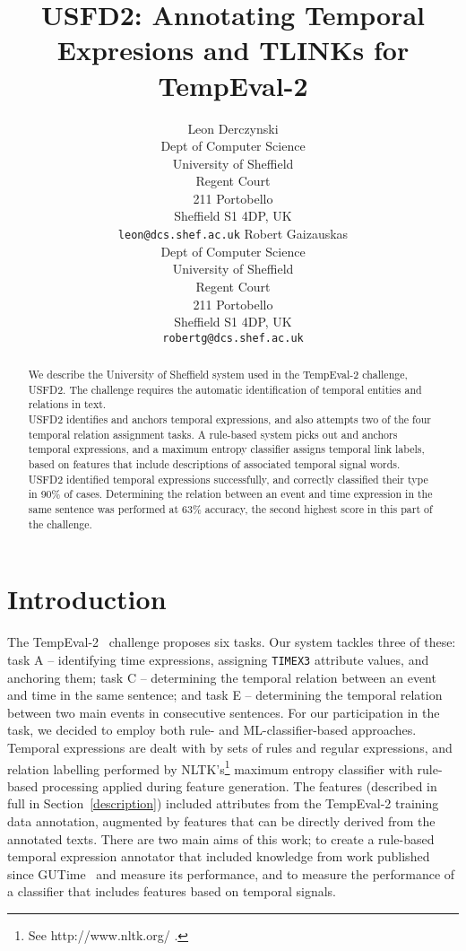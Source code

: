 \documentclass[11pt]{article}
\title{USFD2: Annotating Temporal Expresions and TLINKs for TempEval-2}
\author{Leon Derczynski\\
  Dept of Computer Science\\ 
  University of Sheffield\\ 
  Regent Court\\
  211 Portobello\\ 
  Sheffield S1 4DP, UK\\ 
  {\tt leon@dcs.shef.ac.uk} \And
  Robert Gaizauskas\\
  Dept of Computer Science\\
  University of Sheffield\\
  Regent Court\\
  211 Portobello\\
  Sheffield S1 4DP, UK\\
  {\tt robertg@dcs.shef.ac.uk}
}
\date{}
\begin{document}
\maketitle
\begin{abstract}
We describe the University of Sheffield system used in the TempEval-2 challenge, USFD2. The challenge requires the automatic identification of temporal entities and relations in text. \\USFD2 identifies and anchors temporal expressions, and also attempts two of the four temporal relation assignment tasks. A rule-based system picks out and anchors temporal expressions, and a maximum entropy classifier assigns temporal link labels, based on features that include descriptions of associated temporal signal words. USFD2 identified temporal expressions successfully, and correctly classified their type in 90\% of cases. Determining the relation between an event and time expression in the same sentence was performed at 63\% accuracy, the second highest score in this part of the challenge.
\end{abstract}

\section{Introduction}
The TempEval-2~\cite{pustejovsky2009semeval} challenge proposes six tasks. Our system tackles three of these: task A -- identifying time expressions, assigning {\tt TIMEX3} attribute values, and anchoring them; task C -- determining the temporal relation between an event and time in the same sentence; and task E -- determining the temporal relation between two main events in consecutive sentences. For our participation in the task, we decided to employ both rule- and ML-classifier-based approaches. Temporal expressions are dealt with by sets of rules and regular expressions, and relation labelling performed by NLTK's\footnote{See http://www.nltk.org/ .} maximum entropy classifier with rule-based processing applied during feature generation. The features (described in full in Section~\ref{description}) included attributes from the TempEval-2 training data annotation, augmented by features that can be directly derived from the annotated texts. There are two main aims of this work; to create a rule-based temporal expression annotator that included knowledge from work published since GUTime~\cite{mani2000robust} and measure its performance, and to measure the performance of a classifier that includes features based on temporal signals.
\end{document}
